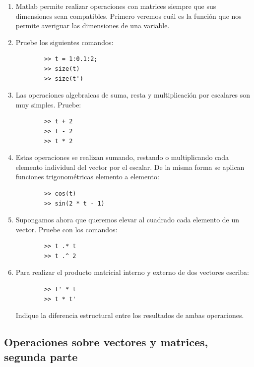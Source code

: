 \documentclass[11pt,a4paper,openany]{book}
\begin{document}
\begin{enumerate}
	\item Matlab permite realizar operaciones con matrices siempre que sus dimensiones sean compatibles. Primero veremos cuál es la función que nos permite averiguar las dimensiones de una variable.
	\item Pruebe los siguientes comandos:
	\begin{verbatim}
		>> t = 1:0.1:2;
		>> size(t)
		>> size(t')
	\end{verbatim}
	
	\item Las operaciones algebraicas de suma, resta y multiplicación por escalares son muy simples. Pruebe:
	\begin{verbatim}
		>> t + 2
		>> t - 2
		>> t * 2
	\end{verbatim}
	
	\item Estas operaciones se realizan sumando, restando o multiplicando cada elemento individual del vector por el escalar. De la misma forma se aplican funciones trigonométricas elemento a elemento:
	\begin{verbatim}
		>> cos(t)
		>> sin(2 * t - 1)
	\end{verbatim}
	
	\item Supongamos ahora que queremos elevar al cuadrado cada elemento de un vector. Pruebe con los comandos:
	\begin{verbatim}
		>> t .* t
		>> t .^ 2
	\end{verbatim}
	
	\item Para realizar el producto matricial interno y externo de dos vectores escriba:
	\begin{verbatim}
		>> t' * t
		>> t * t'
	\end{verbatim}
	Indique la diferencia estructural entre los resultados de ambas operaciones.
\end{enumerate}

\subsection{Operaciones sobre vectores y matrices, segunda parte}
\end{document}
